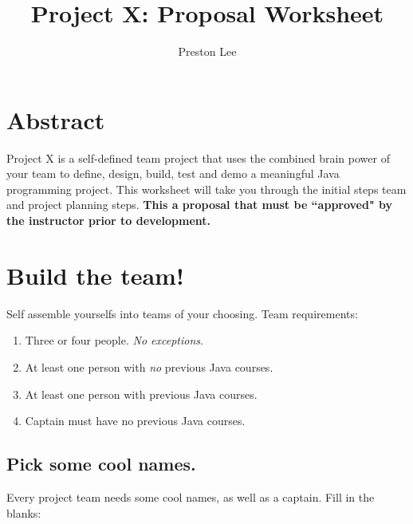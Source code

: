 \documentclass[12pt]{article}
\title{Project X: Proposal Worksheet}
\author{Preston Lee}
\date{}                                           %
\begin{document}
\maketitle
\tableofcontents

\section{Abstract}
Project X is a self-defined team project that uses the combined brain power of your team to define, design, build, test and demo a meaningful Java programming project. This worksheet will take you through the initial steps team and project planning steps. {\bf This a proposal that must be ``approved" by the instructor prior to development.}

\pagebreak
 
\section{Build the team!}
Self assemble yourselfs into teams of your choosing. Team requirements:
\begin{enumerate}
\item Three or four people. {\it No exceptions}.
\item At least one person with {\it no} previous Java courses.
\item At least one person with previous Java courses.
\item Captain must have no previous Java courses.
\end{enumerate}

\subsection{Pick some cool names.}
Every project team needs some cool names, as well as a captain. Fill in the blanks:

\hspace{.5in}{\bf Team Captain: }

\hspace{.5in}{\bf Team Code Name: }

\hspace{.5in}{\bf Project Code Name: }

\end{document}

